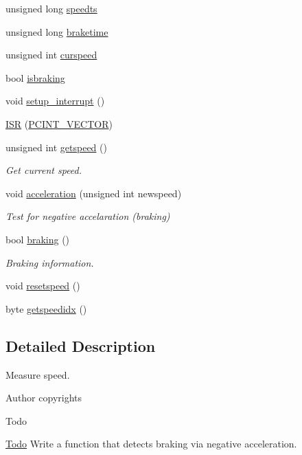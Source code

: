 \begin{DoxyCompactItemize}
\item 
unsigned long \hyperlink{group__speed_ga605bafc427aaa8e9718a112441ba88a7}{speedts}
\item 
unsigned long \hyperlink{group__speed_ga66ce79a1ea6b700d56211c146f679649}{braketime}
\item 
unsigned int \hyperlink{group__speed_ga63232e097931bc02aa65b3b7dadbb74b}{curspeed}
\item 
bool \hyperlink{group__speed_gad13fd9ed7295daa9a51dd2fade080e50}{isbraking}
\item 
void \hyperlink{group__speed_gae87a94769934715c309733cfdf2abcb4}{setup\+\_\+interrupt} ()
\item 
\hyperlink{group__speed_ga44395845abd4a9c31e4fbe88ed717fa3}{I\+SR} (\hyperlink{group__speed_ga77b45027297b1ff40b5b1249afb852e5}{P\+C\+I\+N\+T\+\_\+\+V\+E\+C\+T\+OR})
\item 
unsigned int \hyperlink{group__speed_gafc7b1718f9b23966dfed24056f67996f}{getspeed} ()
\begin{DoxyCompactList}\small\item\em Get current speed. \end{DoxyCompactList}\item 
void \hyperlink{group__speed_gaa41dbc9d264f533090ac3c808c43171f}{acceleration} (unsigned int newspeed)
\begin{DoxyCompactList}\small\item\em Test for negative accelaration (braking) \end{DoxyCompactList}\item 
bool \hyperlink{group__speed_ga3ad56507af5eec4c270def2058efbc3b}{braking} ()
\begin{DoxyCompactList}\small\item\em Braking information. \end{DoxyCompactList}\item 
void \hyperlink{group__speed_ga2004678343c1f7b145dc10aae949a4ec}{resetspeed} ()
\item 
byte \hyperlink{group__speed_gaa1b4f1cc5cf5ba94e3bc38f44e0c7001}{getspeedidx} ()
\end{DoxyCompactItemize}


\subsection{Detailed Description}
Measure speed. 

\begin{DoxyAuthor}{Author}
copyrights 
\end{DoxyAuthor}
\begin{DoxyRefDesc}{Todo}
\item[\hyperlink{todo__todo000005}{Todo}]Write a function that detects braking via negative acceleration. \end{DoxyRefDesc}
